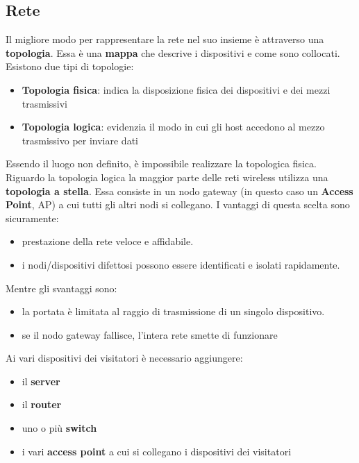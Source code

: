 \subsection{Rete}
Il migliore modo per rappresentare la rete nel suo insieme è attraverso una \textbf{topologia}. Essa è una \textbf{mappa} che descrive i dispositivi e come sono collocati. Esistono due tipi di topologie:
\begin{itemize}
    \item \textbf{Topologia fisica}: indica la disposizione fisica dei dispositivi e dei mezzi trasmissivi
    \item \textbf{Topologia logica}: evidenzia il modo in cui gli host accedono al mezzo trasmissivo per inviare dati
\end{itemize}Essendo il luogo non definito, è impossibile realizzare la topologica fisica. Riguardo la topologia logica la maggior parte delle reti wireless utilizza una \textbf{topologia a stella}. Essa consiste in un nodo gateway (in questo caso un \textbf{Access Point}, AP) a cui tutti gli altri nodi si collegano. I vantaggi di questa scelta sono sicuramente:
\begin{itemize}
    \item prestazione della rete veloce e affidabile.
    \item i nodi/dispositivi difettosi possono essere identificati e isolati rapidamente.
\end{itemize}
Mentre gli svantaggi sono: 
\begin{itemize}
    \item la portata è limitata al raggio di trasmissione di un singolo dispositivo.
    \item se il nodo gateway fallisce, l'intera rete smette di funzionare
\end{itemize}
\clearpage
Ai vari dispositivi dei visitatori è necessario aggiungere:
\begin{itemize}
    \item il \textbf{server}
    \item il \textbf{router}
    \item uno o più \textbf{switch}
    \item i vari \textbf{access point} a cui si collegano i dispositivi dei visitatori
\end{itemize}

